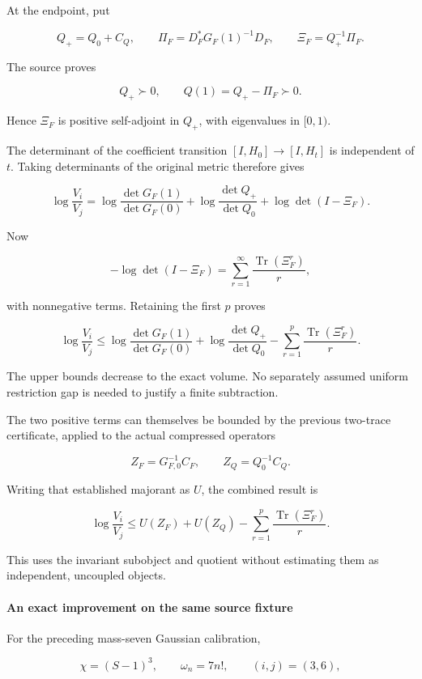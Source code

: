 At the endpoint, put

\[
Q_+=Q_0+C_Q,
\qquad
\Pi_F=D_F^*G_F(1)^{-1}D_F,
\qquad
\boxed{\Xi_F=Q_+^{-1}\Pi_F.}
\]

The source proves

\[
Q_+\succ0,\qquad Q(1)=Q_+-\Pi_F\succ0.
\]

Hence \(\Xi_F\) is positive self-adjoint in \(Q_+\), with eigenvalues in \([0,1)\).

The determinant of the coefficient transition \([I,H_0]\to[I,H_t]\) is independent of \(t\). Taking determinants of the original metric therefore gives

\[
\boxed{
\log\frac{V_i}{V_j}
=
\log\frac{\det G_F(1)}{\det G_F(0)}
+
\log\frac{\det Q_+}{\det Q_0}
+
\log\det(I-\Xi_F).
}
\]

Now

\[
-\log\det(I-\Xi_F)
=
\sum_{r=1}^{\infty}\frac{\operatorname{Tr}(\Xi_F^r)}r,
\]

with nonnegative terms. Retaining the first \(p\) proves

\[
\boxed{
\log\frac{V_i}{V_j}
\le
\log\frac{\det G_F(1)}{\det G_F(0)}
+
\log\frac{\det Q_+}{\det Q_0}
-
\sum_{r=1}^{p}\frac{\operatorname{Tr}(\Xi_F^r)}r.
}
\]

The upper bounds decrease to the exact volume. No separately assumed uniform restriction gap is needed to justify a finite subtraction.

The two positive terms can themselves be bounded by the previous two-trace certificate, applied to the actual compressed operators

\[
Z_F=G_{F,0}^{-1}C_F,\qquad Z_Q=Q_0^{-1}C_Q.
\]

Writing that established majorant as \(U\), the combined result is

\[
\boxed{
\log\frac{V_i}{V_j}
\le
U(Z_F)+U(Z_Q)
-
\sum_{r=1}^{p}\frac{\operatorname{Tr}(\Xi_F^r)}r.
}
\]

This uses the invariant subobject and quotient without estimating them as independent, uncoupled objects.

\paragraph{An exact improvement on the same source fixture}\label{endpoint-exponential_constituent_original--an-exact-improvement-on-the-same-source-fixture}

For the preceding mass-seven Gaussian calibration,

\[
\chi=(S-1)^3,\qquad
\omega_n=7n!,
\qquad(i,j)=(3,6),
\]

